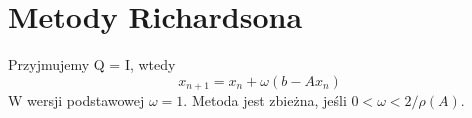 \section{Metody Richardsona}
Przyjmujemy Q = I, wtedy
\[
	x_{n+1} = x_n + \omega(b - Ax_n)
\]
W wersji podstawowej \( \omega = 1 \). Metoda jest zbieżna, jeśli \( 0 < \omega < 2 / \rho(A) \).